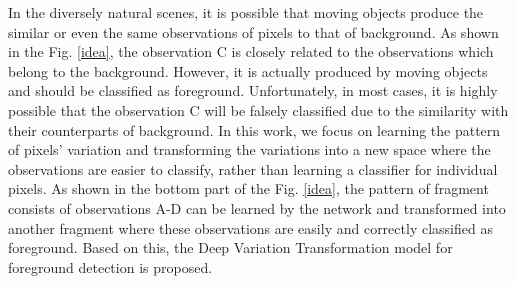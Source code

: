 \documentclass[journal]{IEEEtran}
\newcommand{\reffig}[1]{Fig. \ref{#1}}
\begin{document}
In the diversely natural scenes,
it is possible that moving objects produce the similar or even the same observations of pixels to that of background.
As shown in the \reffig{idea},
the observation C is closely related to the observations which belong to the background. However, it is actually produced by moving objects and should be classified as foreground.
Unfortunately, in most cases, it is highly possible that the observation C will be falsely classified due to the similarity with their counterparts of background.
In this work, we focus on learning the pattern of pixels' variation and transforming the variations into a new space where the observations are easier to classify, rather than learning a classifier for individual pixels.
As shown in the bottom part of the \reffig{idea}, the pattern of fragment consists of observations A-D can be learned by the network and transformed into another fragment where these observations are easily and correctly classified as foreground.
Based on this, the Deep Variation Transformation model for foreground detection is proposed.
\end{document}

